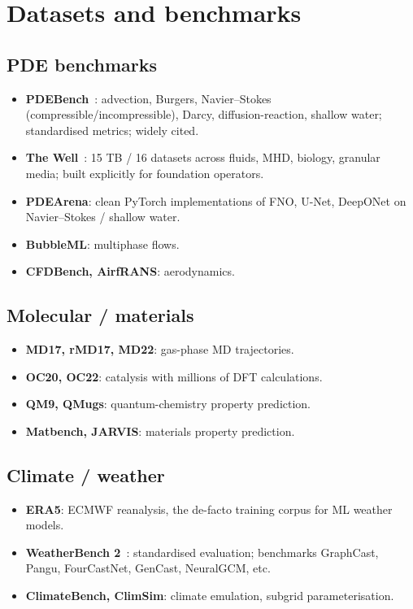 \section{Datasets and benchmarks}
\subsection{PDE benchmarks}
\begin{itemize}
\item \textbf{PDEBench}~\cite{takamoto2022pdebench}: advection, Burgers,
Navier--Stokes (compressible/incompressible), Darcy, diffusion-reaction,
shallow water; standardised metrics; widely cited.
\item \textbf{The Well}~\cite{ohana2024well}: 15 TB / 16 datasets across
fluids, MHD, biology, granular media; built explicitly for foundation
operators.
\item \textbf{PDEArena}: clean PyTorch implementations of FNO, U-Net,
DeepONet on Navier--Stokes / shallow water.
\item \textbf{BubbleML}: multiphase flows.
\item \textbf{CFDBench, AirfRANS}: aerodynamics.
\end{itemize}

\subsection{Molecular / materials}
\begin{itemize}
\item \textbf{MD17, rMD17, MD22}: gas-phase MD trajectories.
\item \textbf{OC20, OC22}: catalysis with millions of DFT calculations.
\item \textbf{QM9, QMugs}: quantum-chemistry property prediction.
\item \textbf{Matbench, JARVIS}: materials property prediction.
\end{itemize}

\subsection{Climate / weather}
\begin{itemize}
\item \textbf{ERA5}: ECMWF reanalysis, the de-facto training corpus for
ML weather models.
\item \textbf{WeatherBench 2}~\cite{rasp2024wb2}: standardised
evaluation; benchmarks GraphCast, Pangu, FourCastNet, GenCast,
NeuralGCM, etc.
\item \textbf{ClimateBench, ClimSim}: climate emulation, subgrid
parameterisation.
\end{itemize}

